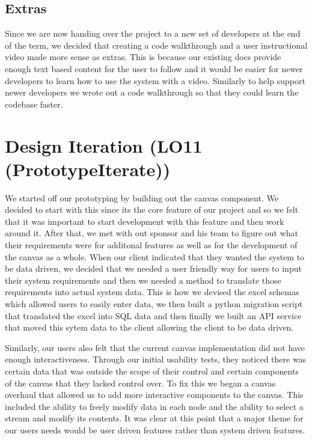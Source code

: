 \documentclass{article}
\begin{document}
\subsection{Extras}

Since we are now handing over the project to a new set of developers at the end of the term, we decided that creating a code walkthrough and a user instructional video made more sense as extras. This is because our existing docs provide enough text based content for the user to follow and it would be easier for newer developers to learn how to use the system with a video. Similarly to help support newer developers we wrote out a code walkthrough so that they could learn the codebase faster. 

\section{Design Iteration (LO11 (PrototypeIterate))}

We started off our prototyping by building out the canvas component. We decided to start with this since its the core feature of our project and so we felt that it was important to start development with this feature and then work around it. After that, we met with out sponsor and his team to figure out what their requirements were for additonal features as well as for the development of the canvas as a whole. When our client indicated that they wanted the system to be data driven, we decided that we needed a user friendly way for users to input their system requirements and then we needed a method to translate those requirements into actual system data. This is how we devised the excel schemas which allowed users to easily enter data, we then built a python migration script that translated the excel into SQL data and then finally we built an API service that moved this sytem data to the client allowing the client to be data driven. 

Similarly, our users also felt that the current canvas implementation did not have enough interactiveness. Through our initial usability tests, they noticed there was certain data that was outside the scope of their control and certain components of the canvas that they lacked control over. To fix this we began a canvas overhaul that allowed us to add more interactive components to the canvas. This included the ability to freely modify data in each node and the ability to select a stream and modify its contents. It was clear at this point that a major theme for our users needs would be user driven features rather than system driven features. 
\end{document}
